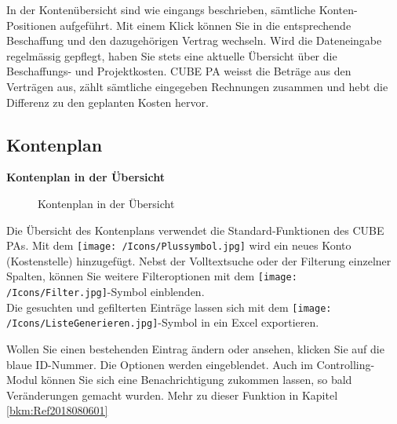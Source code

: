 In der Kontenübersicht sind wie eingangs beschrieben, sämtliche Konten-Positionen aufgeführt. Mit einem Klick können Sie in die entsprechende Beschaffung und den dazugehörigen Vertrag wechseln. Wird die Dateneingabe regelmässig gepflegt, haben Sie stets eine aktuelle Übersicht über die Beschaffungs- und Projektkosten. CUBE PA weisst die Beträge aus den Verträgen aus, zählt sämtliche eingegeben Rechnungen zusammen und hebt die Differenz zu den geplanten Kosten hervor.

\subsection{Kontenplan}

\textbf{Kontenplan in der Übersicht}

\begin{figure}[H]
\caption{Kontenplan in der Übersicht}
\end{figure}

Die Übersicht des Kontenplans verwendet die Standard-Funktionen des CUBE PAs. Mit dem \texttt{[image: /Icons/Plussymbol.jpg]} wird ein neues Konto (Kostenstelle) hinzugefügt. Nebst der Volltextsuche oder der Filterung einzelner Spalten, können Sie weitere Filteroptionen mit dem \texttt{[image: /Icons/Filter.jpg]}-Symbol einblenden.\\
Die gesuchten und gefilterten Einträge lassen sich mit dem \texttt{[image: /Icons/ListeGenerieren.jpg]}-Symbol in ein Excel exportieren.

\vspace{\baselineskip}

Wollen Sie einen bestehenden Eintrag ändern oder ansehen, klicken Sie auf die blaue ID-Nummer. Die Optionen werden eingeblendet. Auch im Controlling-Modul können Sie sich eine Benachrichtigung zukommen lassen, so bald Veränderungen gemacht wurden. Mehr zu dieser Funktion in Kapitel \ref{bkm:Ref2018080601}

